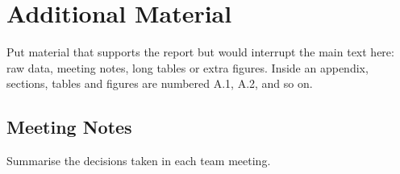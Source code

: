 \section{Additional Material}\label{app:example}

Put material that supports the report but would interrupt the main text here: raw data, meeting notes, long tables or extra figures. Inside an appendix, sections, tables and figures are numbered A.1, A.2, and so on.

\subsection{Meeting Notes}\label{app:meeting-notes}
Summarise the decisions taken in each team meeting.

